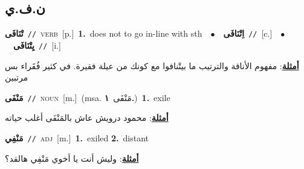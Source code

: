 \documentclass[10pt,a4paper,twoside]{article} %
\begin{document}
\begin{multicols}{2}
\vspace{-3mm}
\subsection*{\color{blue}\foreignlanguage{arabic}{ن.ف.ي}\color{blue}{}} 

{\setlength\topsep{0pt}\textbf{\foreignlanguage{arabic}{تْنَافَى}}\ {\color{gray}\texttt{//}\color{black}}\ \textsc{verb}\ [p.]\ \textbf{1.}~does not to go in-line with sth\ \ $\bullet$\ \ \setlength\topsep{0pt}\textbf{\foreignlanguage{arabic}{اِتْنَافَى}}\ {\color{gray}\texttt{//}\color{black}}\ [c.]\ \ $\bullet$\ \ \setlength\topsep{0pt}\textbf{\foreignlanguage{arabic}{يِتْنَافَى}}\ {\color{gray}\texttt{//}\color{black}}\ [i.]\  \begin{flushright}\color{gray}\foreignlanguage{arabic}{\textbf{\underline{\foreignlanguage{arabic}{أمثلة}}}: مفهوم الأناقة والترتيب ما بيتْنافوا مع كونك من عيلة فقيرة. في كثير فُقَراء بس مرتبين}\end{flushright}\color{black}} \vspace{2mm}

{\setlength\topsep{0pt}\textbf{\foreignlanguage{arabic}{مَنْفَى}}\ {\color{gray}\texttt{//}\color{black}}\ \textsc{noun}\ [m.]\ \color{gray}(msa. \foreignlanguage{arabic}{مَنْفَى}~\foreignlanguage{arabic}{\textbf{١.}})\color{black}\ \textbf{1.}~exile\  \begin{flushright}\color{gray}\foreignlanguage{arabic}{\textbf{\underline{\foreignlanguage{arabic}{أمثلة}}}: محمود درويش عاش بالمَنْفَى أغلب حياته}\end{flushright}\color{black}} \vspace{2mm}

{\setlength\topsep{0pt}\textbf{\foreignlanguage{arabic}{مَنْفِي}}\ {\color{gray}\texttt{//}\color{black}}\ \textsc{adj}\ [m.]\ \textbf{1.}~exiled  \textbf{2.}~distant\  \begin{flushright}\color{gray}\foreignlanguage{arabic}{\textbf{\underline{\foreignlanguage{arabic}{أمثلة}}}: وليش أنت يا أخوي مَنْفِي هالقد؟}\end{flushright}\color{black}} \vspace{2mm}


\end{multicols}
\end{document}
